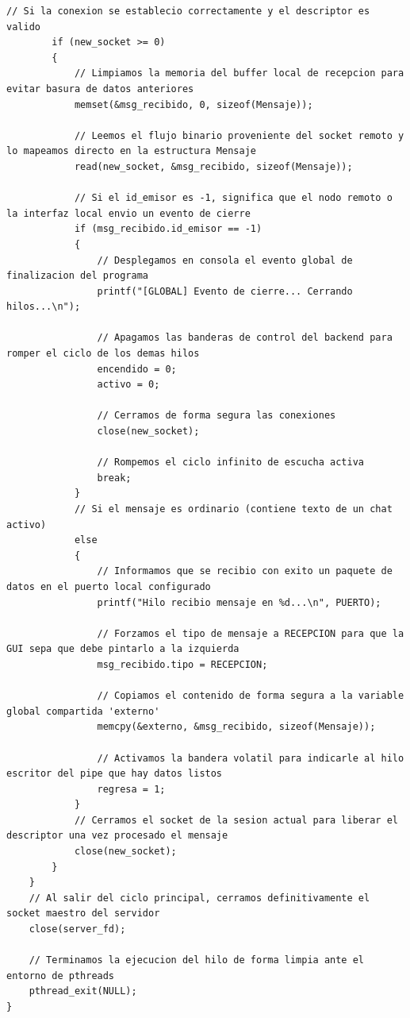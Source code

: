 \begin{lstlisting}[style=estiloC, caption={Archivo del Back-End (conexion P2P)}]
        // Si la conexion se establecio correctamente y el descriptor es valido
        if (new_socket >= 0)
        {
            // Limpiamos la memoria del buffer local de recepcion para evitar basura de datos anteriores
            memset(&msg_recibido, 0, sizeof(Mensaje));

            // Leemos el flujo binario proveniente del socket remoto y lo mapeamos directo en la estructura Mensaje
            read(new_socket, &msg_recibido, sizeof(Mensaje));

            // Si el id_emisor es -1, significa que el nodo remoto o la interfaz local envio un evento de cierre
            if (msg_recibido.id_emisor == -1)
            {
                // Desplegamos en consola el evento global de finalizacion del programa
                printf("[GLOBAL] Evento de cierre... Cerrando hilos...\n");

                // Apagamos las banderas de control del backend para romper el ciclo de los demas hilos
                encendido = 0;
                activo = 0;

                // Cerramos de forma segura las conexiones
                close(new_socket);

                // Rompemos el ciclo infinito de escucha activa
                break;
            }
            // Si el mensaje es ordinario (contiene texto de un chat activo)
            else
            {
                // Informamos que se recibio con exito un paquete de datos en el puerto local configurado
                printf("Hilo recibio mensaje en %d...\n", PUERTO);

                // Forzamos el tipo de mensaje a RECEPCION para que la GUI sepa que debe pintarlo a la izquierda
                msg_recibido.tipo = RECEPCION;

                // Copiamos el contenido de forma segura a la variable global compartida 'externo'
                memcpy(&externo, &msg_recibido, sizeof(Mensaje));

                // Activamos la bandera volatil para indicarle al hilo escritor del pipe que hay datos listos
                regresa = 1;
            }
            // Cerramos el socket de la sesion actual para liberar el descriptor una vez procesado el mensaje
            close(new_socket);
        }
    }
    // Al salir del ciclo principal, cerramos definitivamente el socket maestro del servidor
    close(server_fd);

    // Terminamos la ejecucion del hilo de forma limpia ante el entorno de pthreads
    pthread_exit(NULL);
}


\end{lstlisting}
